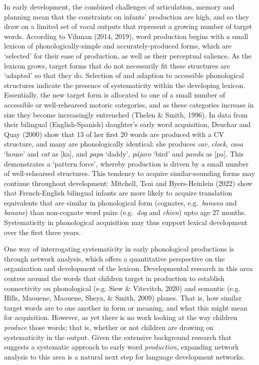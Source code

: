 \documentclass[
  man]{apa6}
\begin{document}
In early development, the combined challenges of articulation, memory and planning mean that the constraints on infants' production are high, and so they draw on a limited set of vocal outputs that represent a growing number of target words. According to Vihman (2014, 2019), word production begins with a small lexicon of phonologically-simple and accurately-produced forms, which are `selected' for their ease of production, as well as their perceptual salience. As the lexicon grows, target forms that do not necessarily fit these structures are `adapted' so that they do. Selection of and adaption to accessible phonological structures indicate the presence of systematicity within the developing lexicon. Essentially, the new target form is allocated to one of a small number of accessible or well-rehearsed motoric categories, and as these categories increase in size they become increasingly entrenched (Thelen \& Smith, 1996). In data from their bilingual (English-Spanish) daughter's early word acquisition, Deuchar and Quay (2000) show that 13 of her first 20 words are produced with a CV structure, and many are phonologically identical: she produces \emph{car}, \emph{clock}, \emph{casa} `house' and \emph{cat} as {[}ka{]}, and \emph{papa} `daddy', \emph{pájaro} `bird' and \emph{panda} as {[}pa{]}. This demonstrates a `pattern force', whereby production is driven by a small number of well-rehearsed structures. This tendency to acquire similar-sounding forms may continue throughout development: Mitchell, Tsui and Byers-Heinlein (2022) show that French-English bilingual infants are more likely to acquire translation equivalents that are similar in phonological form (cognates, e.g.~\emph{banana} and \emph{banane}) than non-cognate word pairs (e.g.~\emph{dog} and \emph{chien}) upto age 27 months. Systematicity in phonological acquisition may thus support lexical development over the first three years.

One way of interrogating systematicity in early phonological productions is through network analysis, which offers a quantitative perspective on the organization and development of the lexicon. Developmental research in this area centres around the words that children target in production to establish connectivity on phonological (e.g. Siew \& Vitevitch, 2020) and semantic (e.g. Hills, Maouene, Maouene, Sheya, \& Smith, 2009) planes. That is, how similar target words are to one another in form or meaning, and what this might mean for acquisition. However, as yet there is no work looking at the way children \emph{produce} those words; that is, whether or not children are drawing on systematicity in the output. Given the extensive background research that suggests a systematic approach to early word \emph{production}, expanding network analysis to this area is a natural next step for language development networks.
\end{document}
